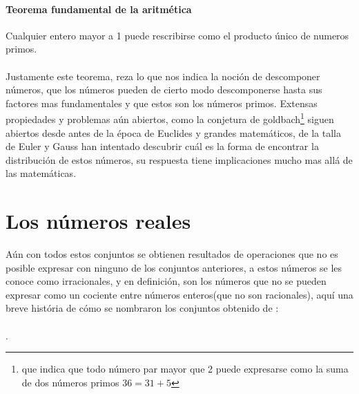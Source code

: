 \documentclass{article}
\begin{document}
\paragraph{Teorema fundamental de la aritmética} Cualquier entero mayor a 1 puede rescribirse como el producto único de numeros primos.

\paragraph{}
Justamente este teorema, reza lo que nos indica la noción de descomponer números, que los números pueden de cierto modo descomponerse hasta sus factores mas fundamentales y que estos son los números primos. Extensas propiedades y problemas aún abiertos, como la conjetura de goldbach\footnote{que indica que todo número par mayor que 2 puede expresarse como la suma de dos números primos $36 = 31 + 5$} siguen abiertos desde antes de la época de Euclides y grandes matemáticos, de la talla de Euler y Gauss han intentado descubrir cuál es la forma de encontrar la distribución de estos números, su respuesta tiene implicaciones mucho mas allá de las matemáticas.

\section{Los números reales}

Aún con todos estos conjuntos se obtienen resultados de operaciones que no es posible expresar con ninguno de los conjuntos anteriores, a estos números se les conoce como irracionales, y en definición, son los números que no se pueden expresar como un cociente entre números enteros(que no son racionales), aquí una breve história de cómo se nombraron los conjuntos obtenido de \cite{patino_duque_1977}:

\paragraph{}
.
\end{document}
